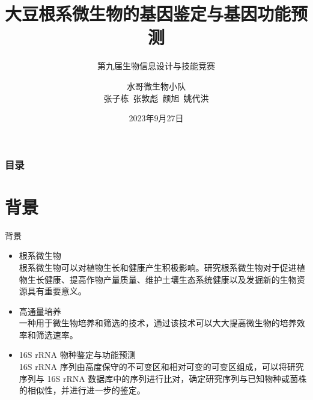 \documentclass[UTF8]{ctexbeamer}
\author[张子栋~张敦彪~颜旭~姚代洪]{水哥微生物小队\\张子栋~张敦彪~颜旭~姚代洪}
\title[大豆根系微生物的基因鉴定与基因功能预测]{大豆根系微生物的基因鉴定与基因功能预测}
\subtitle{第九届生物信息设计与技能竞赛}
\institute[HZAU CoI]{华中农业大学
	
	信息学院}
\date{2023年9月27日}
\begin{document}
	\kaishu


	\begin{frame}
		\titlepage
		
	\end{frame}



	\begin{frame}
		\frametitle{目录}
		\tableofcontents
	\end{frame}


	\section{背景}
	\begin{frame}{背景}
		\begin{itemize}
			\item 根系微生物\\ \qquad 根系微生物可以对植物生长和健康产生积极影响。研究根系微生物对于促进植物生长健康、提高作物产量质量、维护土壤生态系统健康以及发掘新的生物资源具有重要意义。
			\item 高通量培养\\ \qquad 一种用于微生物培养和筛选的技术，通过该技术可以大大提高微生物的培养效率和筛选速率。
			\item 16S rRNA 物种鉴定与功能预测 \\ \qquad 16S rRNA 序列由高度保守的不可变区和相对可变的可变区组成，可以将研究序列与 16S rRNA 数据库中的序列进行比对，确定研究序列与已知物种或菌株的相似性，并进行进一步的鉴定。
		\end{itemize}
	
	\end{frame}

\end{document}
